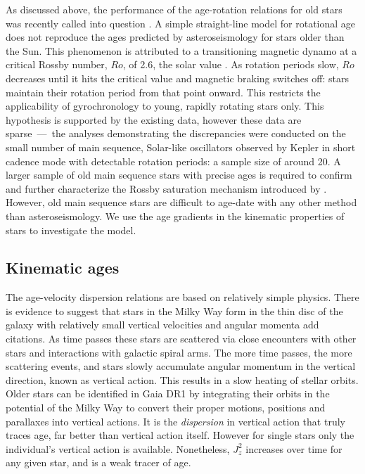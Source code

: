 \documentclass[useAMS, usenatbib, preprint, 12pt]{aastex}
\newcommand{\racomment}[1]{{\color{red}#1}}
\begin{document}
As discussed above, the performance of the age-rotation relations for old
stars was recently called into question \citep{Angus2015, Vansaders2016,
Metcalfe2016}.
A simple straight-line model for rotational age does not reproduce the ages
predicted by asteroseismology for stars older than the Sun.
This phenomenon is attributed to a transitioning magnetic dynamo at a critical
Rossby number, $Ro$, of 2.6, the solar value \citep{Vansaders2016}.
As rotation periods slow, $Ro$ decreases until it hits the critical value and
magnetic braking switches off: stars maintain their rotation period from that
point onward.
This restricts the applicability of gyrochronology to young, rapidly rotating
stars only.
This hypothesis is supported by the existing data, however these data are
sparse~---~the analyses demonstrating the discrepancies were conducted on the
small number of main sequence, Solar-like oscillators observed by Kepler in
short cadence mode with detectable rotation periods: a sample size of around
20.
A larger sample of old main sequence stars with precise ages is required to
confirm and further characterize the Rossby saturation mechanism introduced by
\citep{Vansaders2016}.
However, old main sequence stars are difficult to age-date with any other
method than asteroseismology.
We use the age gradients in the kinematic properties of stars to investigate
the \citet{Vansaders2016} model.

\subsection{Kinematic ages}
The age-velocity dispersion relations are based on relatively simple physics.
There is evidence to suggest that stars in the Milky Way form in the thin disc
of the galaxy with relatively small vertical velocities and angular momenta
\racomment{add citations}.
As time passes these stars are scattered via close encounters with other
stars and interactions with galactic spiral arms.
The more time passes, the more scattering events, and stars slowly accumulate
angular momentum in the vertical direction, known as vertical action.
This results in a slow heating of stellar orbits.
Older stars can be identified in Gaia DR1 by integrating their orbits in the
potential of the Milky Way to convert their proper motions, positions and
parallaxes into vertical actions.
It is the {\it dispersion} in vertical action that truly traces age, far
better than vertical action itself.
However for single stars only the individual's vertical action is available.
Nonetheless, $J_z^2$ increases over time for any given star, and is a weak
tracer of age.
\end{document}
